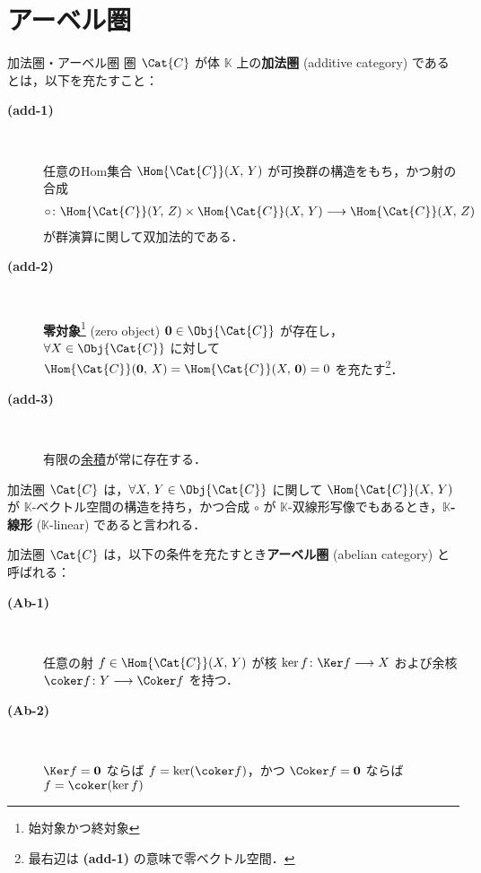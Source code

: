 \documentclass[TQFT_main]{subfiles}
\begin{document}
    \section{アーベル圏}

    \begin{mydef}[label=def:additive-cat,breakable]{加法圏・アーベル圏}
        圏 $\Cat{C}$ が体 $\mathbb{K}$ 上の\textbf{加法圏} (additive category) であるとは，以下を充たすこと：
        \begin{description}
            \item[\textbf{(add-1)}]　
            
            任意のHom集合 $\Hom{\Cat{C}}(X,\, Y)$ が可換群の構造をもち，かつ射の合成
            \begin{align}
                \circ \colon \Hom{\Cat{C}}(Y,\, Z) \times \Hom{\Cat{C}}(X,\, Y) \lto \Hom{\Cat{C}}(X,\, Z)
            \end{align}
            が群演算に関して双加法的である．

            \item[\textbf{(add-2)}]　
            
            \textbf{零対象}\footnote{始対象かつ終対象} (zero object) $\bm{0} \in \Obj{\Cat{C}}$ が存在し，$\forall X \in \Obj{\Cat{C}}$ に対して $\Hom{\Cat{C}}(\bm{0},\, X) = \Hom{\Cat{C}}(X,\, \bm{0}) = 0$ を充たす\footnote{最右辺は \textsf{\textbf{(add-1)}} の意味で零ベクトル空間．}．

            \item[\textbf{(add-3)}]　
            
            有限の\hyperref[def:product-coproduct]{余積}が常に存在する．
        \end{description}
        加法圏 $\Cat{C}$ は，$\forall X,\, Y \in \Obj{\Cat{C}}$ に関して $\Hom{\Cat{C}}(X,\, Y)$ が $\mathbb{K}$-ベクトル空間の構造を持ち，かつ合成 $\circ$ が $\mathbb{K}$-双線形写像でもあるとき，\textbf{$\mathbb{K}$-線形} ($\mathbb{K}$-linear) であると言われる．

        \tcblower

        加法圏 $\Cat{C}$ は，以下の条件を充たすとき\textbf{アーベル圏} (abelian category) と呼ばれる：
        \begin{description}
            \item[\textbf{(Ab-1)}]　
            
            任意の射 $f \in \Hom{\Cat{C}}(X,\, Y)$ が核 $\ker f \colon \Ker f \lto X$ および余核 $\coker f \colon Y \lto \Coker f$ を持つ．

            \item[\textbf{(Ab-2)}]　
            
            $\Ker f = \bm{0}$ ならば $f = \ker (\coker f)$，かつ $\Coker f = \bm{0}$ ならば $f = \coker (\ker f)$
        \end{description}
        
    \end{mydef}
\end{document}
